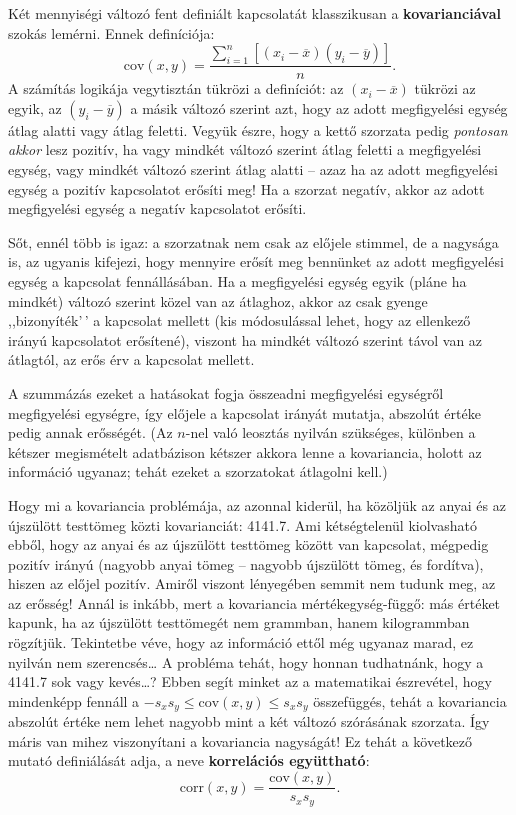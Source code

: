 \documentclass[
]{book}
\begin{document}
Két mennyiségi változó fent definiált kapcsolatát klasszikusan a \textbf{kovarianciával} szokás lemérni. Ennek definíciója:
\[
    \mathrm{cov}\left(x,y\right)=\frac{\sum_{i=1}^n \left[\left(x_i-\overline{x}\right)\left(y_i-\overline{y}\right)\right]}{n}.
\]
A számítás logikája vegytisztán tükrözi a definíciót: az \(\left(x_i-\overline{x}\right)\) tükrözi az egyik, az \(\left(y_i-\overline{y}\right)\) a másik változó szerint azt, hogy az adott megfigyelési egység átlag alatti vagy átlag feletti. Vegyük észre, hogy a kettő szorzata pedig \emph{pontosan akkor} lesz pozitív, ha vagy mindkét változó szerint átlag feletti a megfigyelési egység, vagy mindkét változó szerint átlag alatti -- azaz ha az adott megfigyelési egység a pozitív kapcsolatot erősíti meg! Ha a szorzat negatív, akkor az adott megfigyelési egység a negatív kapcsolatot erősíti.

Sőt, ennél több is igaz: a szorzatnak nem csak az előjele stimmel, de a nagysága is, az ugyanis kifejezi, hogy mennyire erősít meg bennünket az adott megfigyelési egység a kapcsolat fennállásában. Ha a megfigyelési egység egyik (pláne ha mindkét) változó szerint közel van az átlaghoz, akkor az csak gyenge ,,bizonyíték'\,' a kapcsolat mellett (kis módosulással lehet, hogy az ellenkező irányú kapcsolatot erősítené), viszont ha mindkét változó szerint távol van az átlagtól, az erős érv a kapcsolat mellett.

A szummázás ezeket a hatásokat fogja összeadni megfigyelési egységről megfigyelési egységre, így előjele a kapcsolat irányát mutatja, abszolút értéke pedig annak erősségét. (Az \(n\)-nel való leosztás nyilván szükséges, különben a kétszer megismételt adatbázison kétszer akkora lenne a kovariancia, holott az információ ugyanaz; tehát ezeket a szorzatokat átlagolni kell.)

Hogy mi a kovariancia problémája, az azonnal kiderül, ha közöljük az anyai és az újszülött testtömeg közti kovarianciát: 4141.7. Ami kétségtelenül kiolvasható ebből, hogy az anyai és az újszülött testtömeg között van kapcsolat, mégpedig pozitív irányú (nagyobb anyai tömeg -- nagyobb újszülött tömeg, és fordítva), hiszen az előjel pozitív. Amiről viszont lényegében semmit nem tudunk meg, az az erősség! Annál is inkább, mert a kovariancia mértékegység-függő: más értéket kapunk, ha az újszülött testtömegét nem grammban, hanem kilogrammban rögzítjük. Tekintetbe véve, hogy az információ ettől még ugyanaz marad, ez nyilván nem szerencsés\dots{} A probléma tehát, hogy honnan tudhatnánk, hogy a 4141.7 sok vagy kevés\dots{}? Ebben segít minket az a matematikai észrevétel, hogy mindenképp fennáll a \(-s_x s_y \leq \mathrm{cov}\left(x,y\right) \leq s_x s_y\) összefüggés, tehát a kovariancia abszolút értéke nem lehet nagyobb mint a két változó szórásának szorzata. Így máris van mihez viszonyítani a kovariancia nagyságát! Ez tehát a következő mutató definiálását adja, a neve \textbf{korrelációs együttható}:
\[
    \mathrm{corr}\left(x,y\right)=\frac{\mathrm{cov}\left(x,y\right)}{s_x s_y}.
\]
\end{document}

